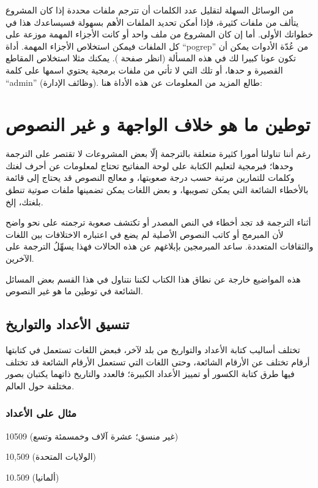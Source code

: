 من الوسائل السهلة لتقليل عدد الكلمات أن تترجم ملفات محددة إذا كان
المشروع يتألف من ملفات كثيرة، فإذا أمكن تحديد الملفات الأهم بسهولة
فسيساعدك هذا في خطواتك الأولى. أما إن كان المشروع من ملف واحد أو كانت
الأجزاء المهمة موزعة على كل الملفات فيمكن استخلاص الأجزاء المهمة. أداة
“pogrep” من عُدّة الأدوات يمكن أن تكون عونا كبيرا لك في هذه المسألة
(انظر صفحة \at[ref:20165030]). يمكنك مثلا استخلاص المقاطع
القصيرة و حدها، أو تلك التي لا تأتي من ملفات برمجية يحتوي اسمها على
كلمة “admin” (وظائف الإدارة). طالع المزيد من المعلومات عن هذه الأداة
هنا:


\section{توطين ما هو خلاف الواجهة و غير النصوص}
رغم أننا تناولنا أمورا كثيرة متعلقة بالترجمة إلّا بعض المشروعات لا تقتصر
على الترجمة وحدها؛ فبرمجية لتعليم الكتابة على لوحة المفاتيح تحتاج
لمعلومات عن أحرف لغتك وكلمات للتمارين مرتبة حسب درجة صعوبتها، و معالج
النصوص قد يحتاج إلى قائمة بالأخطاء الشائعة التي يمكن تصويبها، و بعض
اللغات يمكن تضمينها ملفات صوتية تنطق بلغتك، إلخ.

أثناء الترجمة قد تجد أخطاء في النص المصدر أو تكتشف صعوبة ترجمته على نحو
واضح لأن المبرمج أو كاتب النصوص الأصلية لم يضع في اعتباره الاختلافات
بين اللغات والثقافات المتعددة. ساعد المبرمجين بإبلاغهم عن هذه الحالات
فهذا يسهِّلُ الترجمة على الآخرين.

هذه المواضيع خارجة عن نطاق هذا الكتاب لكننا نتناول في هذا القسم بعض
المسائل الشائعة في توطين ما هو غير النصوص.

\subsection[ref:30596701]{تنسيق الأعداد والتواريخ}
تختلف أساليب كتابة الأعداد
والتواريخ من بلد لآخر، فبعض اللغات تستعمل في كتابتها أرقام تختلف عن
الأرقام الشائعة، وحتى اللغات التي تستعمل الأرقام الشائعة قد تختلف فيها
طرق كتابة الكسور أو تمييز الأعداد الكبيرة؛ فالعدد والتاريخ ذاتهما
يكتبان بصور مختلفة حول العالم.

\subsubsection{مثال على الأعداد}
10509 (غير منسق؛ عشرة آلاف وخمسمئة وتسع)

10,509 (الولايات المتحدة)

10.509 (ألمانيا)

